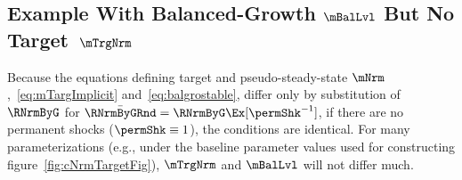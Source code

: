 \documentclass[BufferStockTheory]{subfiles}
\begin{document}
\begin{comment}
  \hypertarget{log-pseudo-steady-state}{}
  \subsubsection{The  expected `log-pseudo steady state'}\label{subsubsec:logpseudosteadystate}

  A final point of stability will be indicated by a $\sim$ accent; this is the $\mNrm$ at which the expectation of $\log \mLvl$ is unchanging.

  \begin{verbatimwrite}{Equations/TheoremGroIsStable}
    \begin{theorem}\label{thm:TheoremGroIsStable}{}{\label{thm:TheoremGroIsStable}}
      For the non-degenerate solution to Section~\ref{subsec:Setup}'s problem when {\FVAC}, {\WRIC}, and {\GICRaw} all hold, there exists a unique cash-on-hand-to-permanent-income ratio $\mBalLvl>0$ such that
      \begin{equation}
        \Ex_t [\log {\mLvl}_{t+1} ] = \log \mLvl_t \mbox{~if~} \mLvl_t = \mBalLvl.
        \label{eq:mTarget}
      \end{equation}
      Moreover, $\mBalLvl$ is a point of stability in the sense that
      \begin{equation} \label{eq:stabilityLog}
        \begin{split}
          \forall {\mNrm}_t\in(0,\mBalLvl),      \,\,& \Ex_t [\log {\mLvl}_{t+1}] > \log {\mLvl}_t  \\
          \forall {\mNrm}_t\in(\mBalLvl,\infty), \,\,& \Ex_t [\log {\mLvl}_{t+1}] < \log {\mLvl}_t.
        \end{split}
      \end{equation}
    \end{theorem}
  \end{verbatimwrite}
  

  with two associated Lemmas demonstrating that $\mBalLvl < \mBalLog$ and $\mBalLvl < \$\mTrgNrm$.
\end{comment}


\subsection{Example With Balanced-Growth \texorpdfstring{$\mBalLvl$}{m} But No Target~\texorpdfstring{$\mTrgNrm$}{m}}

Because the equations defining target and pseudo-steady-state $\mNrm$,~\eqref{eq:mTargImplicit} and~\eqref{eq:balgrostable}, differ only by substitution of $\RNrmByG$ for $\bar{\RNrmByGRnd}=\RNrmByG \Ex[\permShk^{-1}]$, if there are no permanent shocks ($\permShk \equiv 1$), the conditions are identical.
For many parameterizations (e.g., under the baseline parameter values used for constructing figure~\ref{fig:cNrmTargetFig}), $\mTrgNrm$ and $\mBalLvl$ will not differ much.
\end{document}
